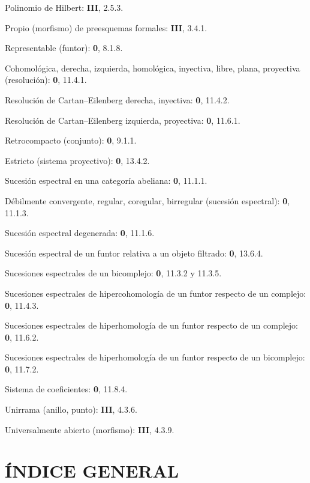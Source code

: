 \documentclass[10pt,oneside,openany]{book}
\theoremstyle{egaenv}\newtheorem*{env}{---}
\theoremstyle{egastatement}
\theoremstyle{egadescription}
\newcommand{\oldpage}[2][]{\marginnote{\normalfont\scriptsize\textbf{#1}\,|\,#2}\ignorespaces}
\begin{document}
\begin{flushleft}
Polinomio de Hilbert: \textbf{III}, 2.5.3.

Propio (morfismo) de preesquemas formales: \textbf{III}, 3.4.1.

Representable (funtor): \textbf 0, 8.1.8.

Cohomológica, derecha, izquierda, homológica, inyectiva, libre, plana, proyectiva
(resolución): \textbf 0, 11.4.1.

Resolución de Cartan--Eilenberg derecha, inyectiva: \textbf 0, 11.4.2.

Resolución de Cartan--Eilenberg izquierda, proyectiva: \textbf 0, 11.6.1.

Retrocompacto (conjunto): \textbf 0, 9.1.1.

Estricto (sistema proyectivo): \textbf 0, 13.4.2.

Sucesión espectral en una categoría abeliana: \textbf 0, 11.1.1.

Débilmente convergente, regular, coregular, birregular (sucesión espectral):
\textbf 0, 11.1.3.

Sucesión espectral degenerada: \textbf 0, 11.1.6.

Sucesión espectral de un funtor relativa a un objeto filtrado: \textbf 0, 13.6.4.

Sucesiones espectrales de un bicomplejo: \textbf 0, 11.3.2 y 11.3.5.

Sucesiones espectrales de hipercohomología de un funtor respecto de un complejo:
\textbf 0, 11.4.3.

Sucesiones espectrales de hiperhomología de un funtor respecto de un complejo:
\textbf 0, 11.6.2.

Sucesiones espectrales de hiperhomología de un funtor respecto de un bicomplejo:
\textbf 0, 11.7.2.

Sistema de coeficientes: \textbf 0, 11.8.4.

Unirrama (anillo, punto): \textbf{III}, 4.3.6.

Universalmente abierto (morfismo): \textbf{III}, 4.3.9.
\end{flushleft}

\clearpage
\oldpage[III]{165}
\section*{ÍNDICE GENERAL}
\end{document}
